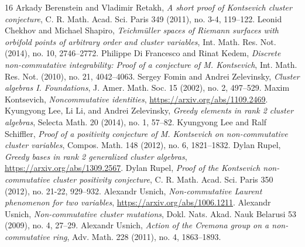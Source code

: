 \documentclass[10pt]{amsart}
\theoremstyle{definition}
\begin{document}
\begin{thebibliography}{16}
 Arkady Berenstein and Vladimir Retakh, \emph{A short proof of Kontsevich cluster conjecture}, C. R. Math. Acad. Sci. Paris 349 (2011), no. 3-4, 119--122.
 Leonid Chekhov and Michael Shapiro, \emph{Teichm\"uller spaces of Riemann surfaces with orbifold points of arbitrary order and cluster variables}, Int. Math. Res. Not. (2014), no. 10, 2746--2772.
 Philippe Di Francesco and Rinat Kedem, \emph{Discrete non-commutative integrability: Proof of a conjecture of M. Kontsevich}, Int. Math. Res. Not. (2010), no. 21, 4042--4063.
 Sergey Fomin and Andrei Zelevinsky, \emph{Cluster algebras I. Foundations}, J. Amer. Math. Soc. 15 (2002), no. 2, 497--529.
 Maxim Kontsevich, \emph{Noncommutative identities}, \url{https://arxiv.org/abs/1109.2469}.
 Kyungyong Lee, Li Li, and Andrei Zelevinsky, \emph{Greedy elements in rank 2 cluster algebras}, Selecta Math. 20 (2014), no. 1, 57--82.
 Kyungyong Lee and Ralf Schiffler, \emph{Proof of a positivity conjecture of M. Kontsevich on non-commutative cluster variables}, Compos. Math. 148 (2012), no. 6, 1821--1832.
 Dylan Rupel, \emph{Greedy bases in rank 2 generalized cluster algebras}, \url{https://arxiv.org/abs/1309.2567}.
 Dylan Rupel, \emph{Proof of the Kontsevich non-commutative cluster positivity conjecture}, C. R. Math. Acad. Sci. Paris 350 (2012), no. 21-22, 929--932.
 Alexandr Usnich, \emph{Non-commutative Laurent phenomenon for two variables}, \url{https://arxiv.org/abs/1006.1211}.
 Alexandr Usnich, \emph{Non-commutative cluster mutations}, Dokl. Nats. Akad. Nauk Belarusi 53 (2009), no. 4, 27--29.
 Alexandr Usnich, \emph{Action of the Cremona group on a non-commutative ring}, Adv. Math. 228 (2011), no. 4, 1863--1893.
\end{thebibliography}
\end{document}
